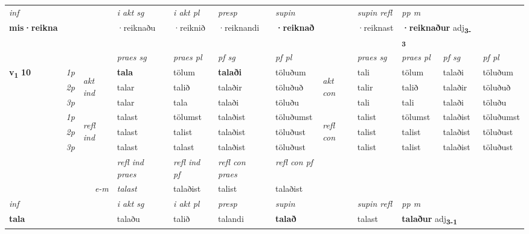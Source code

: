 \begin{longtable}[l]{X>{\footnotesize\itshape}llXXXXlXXXX}
\cmidrule{4-7}
   {\textit{inf}} & &  & \textit{i akt sg} & \textit{i akt pl}   & \textit{presp} & \textit{supin} && \textit{supin refl} & \textit{pp m} \\*
  {\textbf{mis\allowbreak ·reikna}} & && ·reiknaðu  & ·reiknið   & ·reiknandi &  \textbf{·reiknað} && ·reiknast & \multicolumn{2}{l}{\textbf{·reiknaður} adj\textbf{\textsubscript{3-3}}} \\*

\midrule

 & &   & \textit{praes sg}  & \textit{praes pl}    & \textit{ pf sg} & \textit{pf pl} & & \textit{praes sg}  & \textit{praes pl}    & \textit{pf sg} & \textit{pf pl }  \\ \cmidrule{4-7} \cmidrule{9-12}
 \multirow{2}{*}{{{\textbf{v{\textsubscript{1}}} \Large{\textbf{10}}}}}  & 1p & \multirow{3}{*}{\begin{turn}{90}\textit{akt ind}\end{turn}} & \textbf{tala} & tölum & \textbf{talaði} & töluðum & \multirow{3}{*}{\begin{turn}{90}\textit{akt con}\end{turn}} &tali & tölum & talaði & töluðum\\*
 & 2p &  &  talar  & talið & talaðir & töluðuð & & talir & talið & talaðir & töluðuð \\*
 & 3p &  & talar & tala & talaði & töluðu & & tali & tali& talaði & töluðu \\*
\cmidrule{4-7} \cmidrule{9-12}
 & 1p & \multirow{3}{*}{\begin{turn}{90}\textit{refl ind}\end{turn}}  & talast & tölumst & talaðist & töluðumst & \multirow{3}{*}{\begin{turn}{90}\textit{refl con}\end{turn}}  &talist & tölumst & talaðist & töluðumst \\*
 & 2p &  & talast & talist & talaðist & töluðust & &talist & talist & talaðist & töluðust \\*
 & 3p  & & talast & talast & talaðist & töluðust & & talist & talist& talaðist & töluðust \\*
\cmidrule{4-7} \cmidrule{9-12}

 & && \textit{refl ind praes} & \textit{refl ind pf} & \textit{refl con praes} & \textit{refl con pf} \\*
\multicolumn{3}{r}{\textit{e-m}}& talast & talaðist & talist & talaðist \\*

\cmidrule{4-7}
   {\textit{inf}} & &  & \textit{i akt sg} & \textit{i akt pl}   & \textit{presp} & \textit{supin} && \textit{supin refl} & \textit{pp m} \\*
  {\textbf{tala}} & && talaðu  & talið   & talandi &  \textbf{talað} && talast & \multicolumn{2}{l}{\textbf{talaður} adj\textbf{\textsubscript{3-1}}} \\*


\end{longtable}
